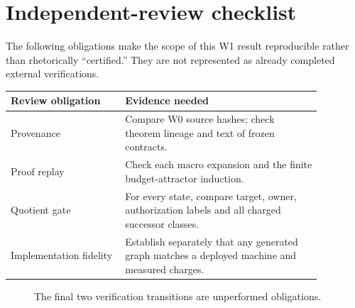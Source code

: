 \documentclass[11pt,letterpaper]{article}
\theoremstyle{definition}
\theoremstyle{remark}
\begin{document}
\section*{Independent-review checklist}
The following obligations make the scope of this W1 result reproducible rather than rhetorically ``certified.'' They are not represented as already completed external verifications.
\begin{center}
\begin{tabular}{p{0.32\linewidth}p{0.55\linewidth}}\toprule
Review obligation & Evidence needed \\\midrule
Provenance & Compare W0 source hashes; check theorem lineage and text of frozen contracts. \\
Proof replay & Check each macro expansion and the finite budget-attractor induction. \\
Quotient gate & For every state, compare target, owner, authorization labels and all charged successor classes. \\
Implementation fidelity & Establish separately that any generated graph matches a deployed machine and measured charges. \\
\bottomrule\end{tabular}
\end{center}
\begin{figure}[ht]\centering{}\caption{The final two verification transitions are unperformed obligations.}\end{figure}
\end{document}
